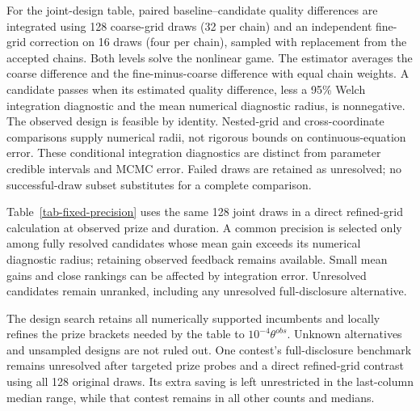 \documentclass[mnsc]{informs3}
\begin{document}
\begin{APPENDICES}
For the joint-design table, paired baseline--candidate quality differences are integrated using 128 coarse-grid draws (32 per chain) and an independent fine-grid correction on 16 draws (four per chain), sampled with replacement from the accepted chains. Both levels solve the nonlinear game. The estimator averages the coarse difference and the fine-minus-coarse difference with equal chain weights. A candidate passes when its estimated quality difference, less a 95\% Welch integration diagnostic and the mean numerical diagnostic radius, is nonnegative. The observed design is feasible by identity. Nested-grid and cross-coordinate comparisons supply numerical radii, not rigorous bounds on continuous-equation error. These conditional integration diagnostics are distinct from parameter credible intervals and MCMC error. Failed draws are retained as unresolved; no successful-draw subset substitutes for a complete comparison.

Table~\ref{tab-fixed-precision} uses the same 128 joint draws in a direct refined-grid calculation at observed prize and duration. A common precision is selected only among fully resolved candidates whose mean gain exceeds its numerical diagnostic radius; retaining observed feedback remains available. Small mean gains and close rankings can be affected by integration error. Unresolved candidates remain unranked, including any unresolved full-disclosure alternative.

The design search retains all numerically supported incumbents and locally refines the prize brackets needed by the table to $10^{-4}\theta^{obs}$. Unknown alternatives and unsampled designs are not ruled out. One contest's full-disclosure benchmark remains unresolved after targeted prize probes and a direct refined-grid contrast using all 128 original draws. Its extra saving is left unrestricted in the last-column median range, while that contest remains in all other counts and medians.




\end{APPENDICES}
\end{document}
